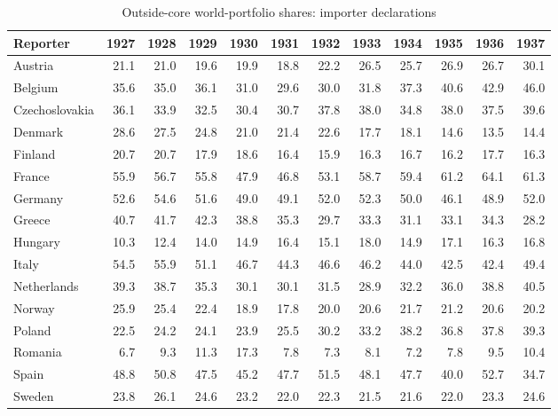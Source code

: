 \clearpage\begin{landscape}
\begin{table}[!htbp]\centering
\caption{Outside-core world-portfolio shares: importer declarations}\label{tab:app_external_import}
\begin{threeparttable}\small\setlength{\tabcolsep}{4pt}
\begin{tabular}{@{}lrrrrrrrrrrr@{}}
\toprule
Reporter & 1927 & 1928 & 1929 & 1930 & 1931 & 1932 & 1933 & 1934 & 1935 & 1936 & 1937 \\
\midrule
Austria & 21.1 & 21.0 & 19.6 & 19.9 & 18.8 & 22.2 & 26.5 & 25.7 & 26.9 & 26.7 & 30.1 \\
Belgium & 35.6 & 35.0 & 36.1 & 31.0 & 29.6 & 30.0 & 31.8 & 37.3 & 40.6 & 42.9 & 46.0 \\
Czechoslovakia & 36.1 & 33.9 & 32.5 & 30.4 & 30.7 & 37.8 & 38.0 & 34.8 & 38.0 & 37.5 & 39.6 \\
Denmark & 28.6 & 27.5 & 24.8 & 21.0 & 21.4 & 22.6 & 17.7 & 18.1 & 14.6 & 13.5 & 14.4 \\
Finland & 20.7 & 20.7 & 17.9 & 18.6 & 16.4 & 15.9 & 16.3 & 16.7 & 16.2 & 17.7 & 16.3 \\
France & 55.9 & 56.7 & 55.8 & 47.9 & 46.8 & 53.1 & 58.7 & 59.4 & 61.2 & 64.1 & 61.3 \\
Germany & 52.6 & 54.6 & 51.6 & 49.0 & 49.1 & 52.0 & 52.3 & 50.0 & 46.1 & 48.9 & 52.0 \\
Greece & 40.7 & 41.7 & 42.3 & 38.8 & 35.3 & 29.7 & 33.3 & 31.1 & 33.1 & 34.3 & 28.2 \\
Hungary & 10.3 & 12.4 & 14.0 & 14.9 & 16.4 & 15.1 & 18.0 & 14.9 & 17.1 & 16.3 & 16.8 \\
Italy & 54.5 & 55.9 & 51.1 & 46.7 & 44.3 & 46.6 & 46.2 & 44.0 & 42.5 & 42.4 & 49.4 \\
Netherlands & 39.3 & 38.7 & 35.3 & 30.1 & 30.1 & 31.5 & 28.9 & 32.2 & 36.0 & 38.8 & 40.5 \\
Norway & 25.9 & 25.4 & 22.4 & 18.9 & 17.8 & 20.0 & 20.6 & 21.7 & 21.2 & 20.6 & 20.2 \\
Poland & 22.5 & 24.2 & 24.1 & 23.9 & 25.5 & 30.2 & 33.2 & 38.2 & 36.8 & 37.8 & 39.3 \\
Romania & 6.7 & 9.3 & 11.3 & 17.3 & 7.8 & 7.3 & 8.1 & 7.2 & 7.8 & 9.5 & 10.4 \\
Spain & 48.8 & 50.8 & 47.5 & 45.2 & 47.7 & 51.5 & 48.1 & 47.7 & 40.0 & 52.7 & 34.7 \\
Sweden & 23.8 & 26.1 & 24.6 & 23.2 & 22.0 & 22.3 & 21.5 & 21.6 & 22.0 & 23.3 & 24.6 \\

\end{tabular}
\end{threeparttable}
\end{table}
\end{landscape}

